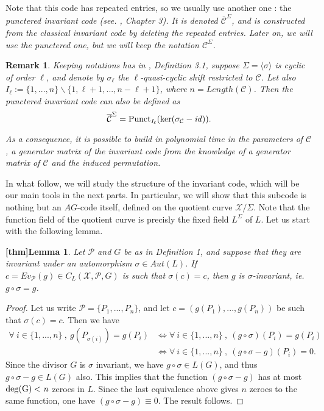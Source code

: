 \documentclass[10pt]{article}
\newtheorem{lem1}{[thm]Lemma}
\newtheorem{rq1}[thm]{Remark}
\newcommand{\s}{\vspace{0.3cm}}
\newcommand{\X}{\mathcal{X}}
\newcommand{\PR}{\mathcal{P}}
\begin{document}
Note that this code has repeated entries, so we usually use another one : the \it{punctered invariant code} \rm (see. \cite{Bar}, Chapter 3). It is denoted $\overline{\mathcal{C}}^{\Sigma}$, and is constructed from the classical invariant code by deleting the repeated entries. Later on, we will use the punctered one, but we will keep the notation $\mathcal{C}^{\Sigma}$. 

\s

\begin{rq1} \rm \label{gen inv}
Keeping notations has in \cite{Bar}, Definition 3.1, suppose $\Sigma = \langle \sigma \rangle$ is cyclic of order $\ell$, and denote by $\sigma_{\ell}$ the $\ell$-quasi-cyclic shift restricted to $\mathcal{C}$. Let also $I_{\ell} := \{1,...,n\}\backslash \{1,\ell+1,...,n-\ell+1\}$, where $n=Length(\mathcal{C})$. Then the punctered invariant code can also be defined as
\[ \overline{\mathcal{C}}^{\Sigma} = \rm Punct_{\it I_{\ell}}(\rm ker (\it \sigma_{\mathcal{C}}-id)).\]

\s

As a consequence, it is possible to build in polynomial time in the parameters of $\mathcal{C}$, a generator matrix of the invariant code from the knowledge of a generator matrix of $\mathcal{C}$ and the induced permutation. 
\end{rq1}


In what follow, we will study the structure of the invariant code, which will be our main tools in the next parts. In particular, we will show that this subcode is nothing but an $AG$-code itself, defined on the quotient curve $\X/\Sigma$. Note that the function field of the quotient curve is precisly the fixed field $L^{\Sigma}$ of $L$. Let us start with the following lemma.

\s

\begin{lem1} \label{inv}
Let $\PR$ and $G$ be as in Definition 1, and suppose that they are invariant under an automorphism $\sigma \in Aut(L)$. If $c = Ev_{\PR}(g) \in C_L(\X,\PR,G)$ is such that $\sigma(c) = c$, then $g$ is $\sigma$-invariant, ie. $g\circ \sigma = g$. 
\end{lem1}

\s

\begin{proof}
Let us write $\PR = \{P_1,...,P_n\}$, and let $c=(g(P_1),...,g(P_n))$ be such that $\sigma(c)=c$. Then we have 
\begin{align*}
\forall \ i \in \{1,...,n\} \ , \ g(P_{\sigma(i)}) = g(P_i) &\iff \forall \ i \in \{1,...,n\} \ , \ (g \circ \sigma)(P_i) =g(P_i) \\
& \iff \forall \ i \in \{1,...,n\} \ , \ (g\circ \sigma - g)(P_i) = 0.
\end{align*}
Since the divisor $G$ is $\sigma$ invariant, we have $g \circ \sigma \in L(G)$, and thus $g\circ \sigma - g \in L(G)$ also. This implies that the function $(g \circ \sigma - g)$ has at most $\rm{deg}(G)<\it{n}$ zeroes in $L$. Since the last equivalence above gives $n$ zeroes to the same function, one have $(g \circ \sigma - g) \equiv 0$. The result follows.
\end{proof}
\end{document}

